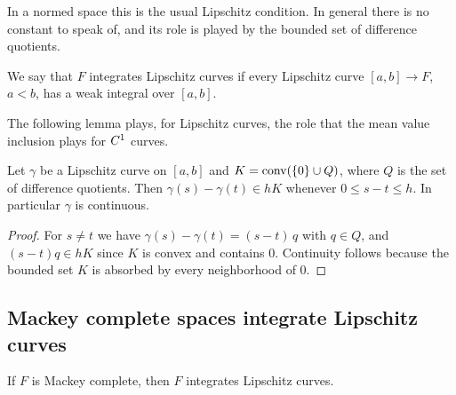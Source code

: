 In a normed space this is the usual Lipschitz condition. In general there is no constant to
speak of, and its role is played by the bounded set of difference quotients.

\begin{definition}
  \label{def:integrates-lipschitz}
  \leanok
  We say that $F$ integrates Lipschitz curves if every Lipschitz curve $[a, b] \to F$, $a < b$,
  has a weak integral over $[a, b]$.
\end{definition}

The following lemma plays, for Lipschitz curves, the role that the mean value inclusion plays
for $C^{1}$ curves.

\begin{lemma}
  \label{lem:lipschitz-continuous}
  \leanok
  Let $\gamma$ be a Lipschitz curve on $[a, b]$ and $K = \operatorname{conv}(\{0\} \cup Q)$, where $Q$ is the
  set of difference quotients. Then $\gamma(s) - \gamma(t) \in h K$ whenever
  $0 \leq s - t \leq h$. In particular $\gamma$ is continuous.
\end{lemma}

\begin{proof}
  \leanok
  For $s \neq t$ we have $\gamma(s) - \gamma(t) = (s - t)\, q$ with $q \in Q$, and
  $(s - t)q \in hK$ since $K$ is convex and contains $0$. Continuity follows because the
  bounded set $K$ is absorbed by every neighborhood of $0$.
\end{proof}

\subsection{Mackey complete spaces integrate Lipschitz curves}

\begin{theorem}
  \label{thm:mackey-to-lipschitz}
  \leanok
  If $F$ is Mackey complete, then $F$ integrates Lipschitz curves.
\end{theorem}

